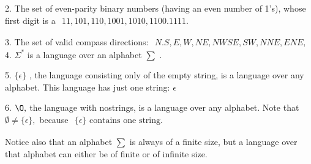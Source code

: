 \documentclass{article}
\begin{document}
2. The set of even-parity binary numbers (having an even number of 1's), whose first digit is a 
$\begin{array}{l}
11, 101, 110,1001, 1010, 1100.1111.
\end{array}$ 

3. The set of valid compass directions: 
$\begin{align*}
N.S, E, W, NE, NW SE, SW, NNE, ENE,
\end{align*}$
4. $\Sigma^{*}$ is a language over an alphabet $\sum$ .

5. $\{\epsilon\}$ , the language consisting only of the empty string, is a language over any alphabet. This
language has just one string: $\epsilon$ 

6. $\O,$ the language with nostrings, is a language over any alphabet. Note that $\emptyset\neq\{\epsilon\},$ because 
$\begin{array}{l}
\{\epsilon\} \mbox{ contains one string}.
\end{array}$

Notice also that an alphabet $\sum$ is always of a finite size, but a language over that alphabet can either be of finite or of infinite size.
\end{document}
